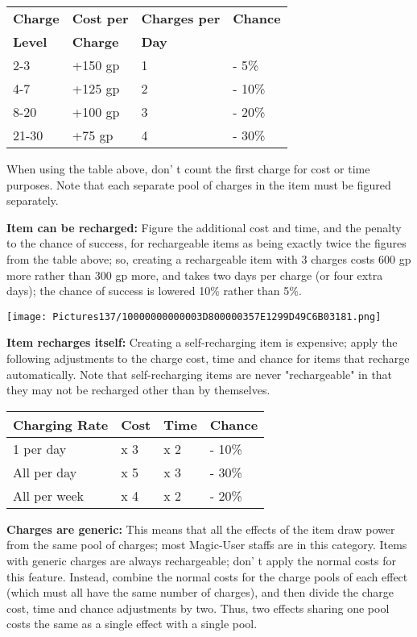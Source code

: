 \documentclass[a4paper,twoside,openany,10pt]{book}
\begin{document}
\begin{multicols}{2}
\begin{tabular*}{0.93\linewidth}{@{\extracolsep{\fill}}llll}
\textbf{Charge} & \textbf{Cost per} & \textbf{Charges per} & \textbf{Chance} \\
\textbf{Level} & \textbf{Charge} & \textbf{Day} &  \\\toprule
2-3 & +150 gp & 1 & - 5\% \\\hline
4-7 & +125 gp & 2 & - 10\% \\\hline
8-20 & +100 gp & 3 & - 20\% \\\hline
21-30 & +75 gp & 4 & - 30\% \\\bottomrule
\end{tabular*}\medskip

When using the table above, don' t count the first charge for cost or time purposes. Note that each separate pool of charges in the item must be figured separately.

\textbf{Item can be recharged:} Figure the additional cost and time, and the penalty to the chance of success, for rechargeable items as being exactly twice the figures from the table above; so, creating a rechargeable item with 3 charges costs 600 gp more rather than 300 gp more, and takes two days per charge (or four extra days); the chance of success is lowered 10\% rather than 5\%.

\begin{center}
	\texttt{[image: Pictures137/10000000000003D800000357E1299D49C6B03181.png]}
\end{center}

\textbf{Item recharges itself:} Creating a self-recharging item is expensive; apply the following adjustments to the charge cost, time and chance for items that recharge automatically. Note that self-recharging items are never "rechargeable" in that they may not be recharged other than by themselves.\medskip

\begin{tabular*}{0.93\linewidth}{@{\extracolsep{\fill}}llll}

\textbf{Charging Rate} & \textbf{Cost} & \textbf{Time} & \textbf{Chance} \\\toprule
1 per day & x 3 & x 2 & - 10\% \\\hline
All per day & x 5 & x 3 & - 30\% \\\hline
All per week & x 4 & x 2 & - 20\% \\\bottomrule
\end{tabular*}\medskip

\textbf{Charges are generic:} This means that all the effects of the item draw power from the same pool of charges; most Magic-User staffs are in this category. Items with generic charges are always rechargeable; don' t apply the normal costs for this feature. Instead, combine the normal costs for the charge pools of each effect (which must all have the same number of charges), and then divide the charge cost, time and chance adjustments by two. Thus, two effects sharing one pool costs the same as a single effect with a single pool. 


\end{multicols}
\end{document}
